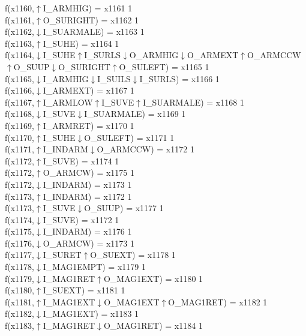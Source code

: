 f(x1160,$\uparrow$I\_ARMHIG) = x1161 {1} \\
f(x1161,$\uparrow$O\_SURIGHT) = x1162 {1} \\
f(x1162,$\downarrow$I\_SUARMALE) = x1163 {1} \\
f(x1163,$\uparrow$I\_SUHE) = x1164 {1} \\
f(x1164,$\downarrow$I\_SUHE$\uparrow$I\_SURLS$\downarrow$O\_ARMHIG$\downarrow$O\_ARMEXT$\uparrow$O\_ARMCCW$\uparrow$O\_SUUP$\downarrow$O\_SURIGHT$\uparrow$O\_SULEFT) = x1165 {1} \\
f(x1165,$\downarrow$I\_ARMHIG$\downarrow$I\_SUILS$\downarrow$I\_SURLS) = x1166 {1} \\
f(x1166,$\downarrow$I\_ARMEXT) = x1167 {1} \\
f(x1167,$\uparrow$I\_ARMLOW$\uparrow$I\_SUVE$\uparrow$I\_SUARMALE) = x1168 {1} \\
f(x1168,$\downarrow$I\_SUVE$\downarrow$I\_SUARMALE) = x1169 {1} \\
f(x1169,$\uparrow$I\_ARMRET) = x1170 {1} \\
f(x1170,$\uparrow$I\_SUHE$\downarrow$O\_SULEFT) = x1171 {1} \\
f(x1171,$\uparrow$I\_INDARM$\downarrow$O\_ARMCCW) = x1172 {1} \\
f(x1172,$\uparrow$I\_SUVE) = x1174 {1} \\
f(x1172,$\uparrow$O\_ARMCW) = x1175 {1} \\
f(x1172,$\downarrow$I\_INDARM) = x1173 {1} \\
f(x1173,$\uparrow$I\_INDARM) = x1172 {1} \\
f(x1173,$\uparrow$I\_SUVE$\downarrow$O\_SUUP) = x1177 {1} \\
f(x1174,$\downarrow$I\_SUVE) = x1172 {1} \\
f(x1175,$\downarrow$I\_INDARM) = x1176 {1} \\
f(x1176,$\downarrow$O\_ARMCW) = x1173 {1} \\
f(x1177,$\downarrow$I\_SURET$\uparrow$O\_SUEXT) = x1178 {1} \\
f(x1178,$\downarrow$I\_MAG1EMPT) = x1179 {1} \\
f(x1179,$\downarrow$I\_MAG1RET$\uparrow$O\_MAG1EXT) = x1180 {1} \\
f(x1180,$\uparrow$I\_SUEXT) = x1181 {1} \\
f(x1181,$\uparrow$I\_MAG1EXT$\downarrow$O\_MAG1EXT$\uparrow$O\_MAG1RET) = x1182 {1} \\
f(x1182,$\downarrow$I\_MAG1EXT) = x1183 {1} \\
f(x1183,$\uparrow$I\_MAG1RET$\downarrow$O\_MAG1RET) = x1184 {1} \\
